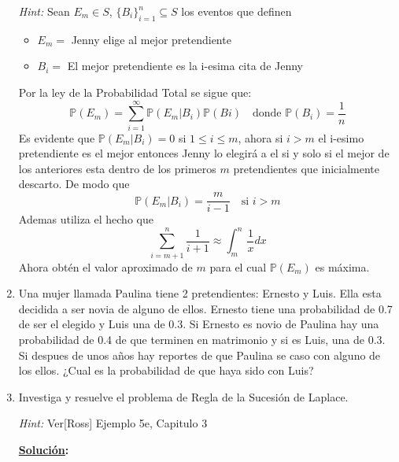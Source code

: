 \documentclass[11pt,letterpaper]{report}
\newcommand{\Pro}{\mathds{P}}
\newcommand{\sol}{\textbf{\underline{Solución}: }} %
\begin{document}
\begin{enumerate}
\textit{Hint: } Sean $E_m \in S$, $\{ B_i \}_{i=1}^{n} \subseteq S$ los eventos que definen
\begin{itemize}
    \item $E_m =$ {Jenny elige al mejor pretendiente}
    \item $B_i =$ {El mejor pretendiente es la i-esima cita de Jenny}
\end{itemize}
Por la ley de la Probabilidad Total se sigue que:
\[
    \Pro(E_m) = \sum_{i=1}^{\infty} \Pro(E_m | B_i) \Pro(Bi)
        \quad \text{donde } \Pro(B_i) = \frac{1}{n}
\]
Es evidente que $\Pro(E_m|B_i) = 0$ si $1 \leq i \leq m$, ahora si $i > m$ el i-esimo pretendiente
es el mejor entonces Jenny lo elegirá a el si y solo si el mejor de los anteriores esta dentro de
los primeros $m$ pretendientes que inicialmente descarto. De modo que
\[
    \Pro(E_m|B_i)= \frac{m}{i-1} \quad \text{si } i>m
\]
Ademas utiliza el hecho que
\[
    \sum_{i=m+1}^{n} \frac{1}{i+1} \approx \int_{m}^{n} \frac{1}{x}dx
\]
Ahora obtén el valor aproximado de $m$ para el cual $\Pro(E_m)$ es máxima.

\item Una mujer llamada Paulina tiene 2 pretendientes: Ernesto y Luis. Ella esta decidida a ser
novia de alguno de ellos. Ernesto tiene una probabilidad de 0.7 de ser el elegido y Luis una de 0.3.
Si Ernesto es novio de Paulina hay una probabilidad de 0.4 de que terminen en matrimonio y si es
Luis, una de 0.3. Si despues de unos años hay reportes de que Paulina se caso con alguno de los
ellos. ¿Cual es la probabilidad de que haya sido con Luis?

\item Investiga y resuelve el problema de Regla de la Sucesión de Laplace.

\textit{Hint:} Ver[Ross] Ejemplo 5e, Capitulo 3

\sol

\end{enumerate}



\end{document}
